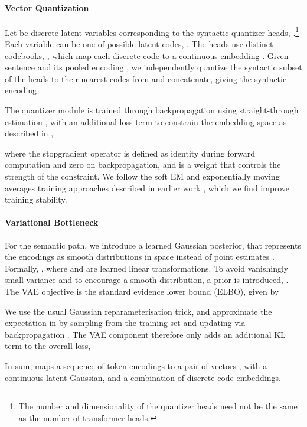 \documentclass[11pt,a4paper]{article}
\begin{document}
\paragraph{Vector Quantization}



Let  be discrete latent variables
corresponding to the syntactic quantizer heads, .\footnote{The
  number and dimensionality of the quantizer heads need not be the
  same as the number of transformer heads.} Each variable can be one
of  possible latent codes, . The heads use distinct
codebooks, ,
which map each discrete code to a continuous embedding
. Given sentence
 and its pooled encoding
,
we independently quantize the syntactic subset of the heads  to their nearest codes from  and
concatenate, giving the syntactic encoding


The quantizer
module is trained through backpropagation using straight-through
estimation \cite{Bengio2013EstimatingOP}, with an additional loss term
to constrain the embedding space as described in \citet{vqvae},

where the stopgradient operator  is defined as identity during
forward computation and zero on backpropagation, and  is a weight that controls the strength of the constraint. We follow the soft EM and exponentially moving averages training
approaches described in earlier work
\cite{roy-theory-experiments,angelidis2020extractive}, which we find improve training stability. 

\paragraph{Variational Bottleneck}

For the semantic path, we introduce a learned Gaussian posterior, that
represents the encodings as smooth distributions in space instead of
point estimates \cite{kingma2013autoencoding}.  Formally,
, where  and  are learned linear
transformations. To avoid vanishingly small variance and to encourage
a smooth distribution, a prior is introduced,
. The VAE objective is the standard evidence lower bound
(ELBO), given by


We use the usual Gaussian reparameterisation trick, and approximate the expectation in
 by sampling from the training set and updating
via backpropagation \cite{kingma2013autoencoding}. The VAE component therefore only adds an
additional KL term to the overall loss,


In sum,  maps a sequence of
token encodings to a pair of vectors , with  a continuous latent
Gaussian, and  a combination of discrete code
embeddings.
\end{document}
